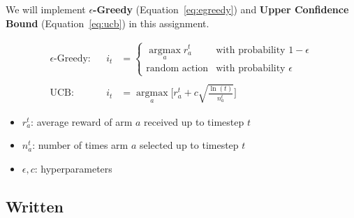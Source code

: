 \documentclass[11pt, letter, answers]{exam}
\begin{document}
\vspace{4em}
We will implement \textbf{$\epsilon$-Greedy} (Equation~\ref{eq:egreedy}) and \textbf{Upper Confidence Bound} (Equation~\ref{eq:ucb}) in this assignment.

{
\Large
\begin{align}
    \epsilon\text{-Greedy:} & & i_t &= \begin{cases}
        \operatorname*{argmax}_a r_a^t & \text{with probability } 1-\epsilon \\
        \text{random action} & \text{with probability } \epsilon
    \end{cases}
    \label{eq:egreedy}
    \\
    \nonumber \\
    \text{UCB:} & & i_t &= \operatorname*{argmax}_a \bigg[
    r_a^t+c\sqrt{\frac{\ln (t)}{n_a^{t}}}
    \bigg]
    \label{eq:ucb}
\end{align}
}

\begin{itemize}
    \item $r_a^t$: average reward of arm $a$ received up to timestep $t$
    \item $n_a^t$: number of times arm $a$ selected up to timestep $t$
    \item $\epsilon, c$: hyperparameters
\end{itemize}


\newpage
\subsection{Written}
\end{document}
